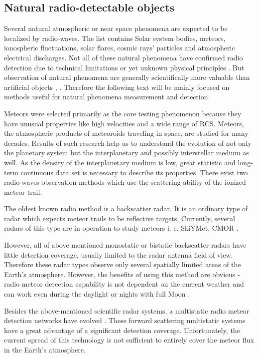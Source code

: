 \documentclass[twoside]{ctuthesis}
\theoremstyle{plain}
\theoremstyle{definition}
\theoremstyle{note}
\begin{document}
\subsection{Natural radio-detectable objects}

Several natural atmospheric or near space phenomena are expected to be localized by radio-waves. The list contains Solar system bodies, meteors, ionospheric fluctuations, solar flares, cosmic rays' particles and atmospheric electrical discharges. Not all of these natural phenomena have confirmed radio detection due to technical limitations or yet unknown physical principles \cite{LOPES}.  But observation of natural phenomena are generally scientifically more valuable than artificial objects \cite{astro_particles}, \cite{LOFAR_showers}. Therefore the following text will be mainly focused on methods useful for natural phenomena measurement and detection. 

Meteors were selected primarily as the core testing phenomenon because they have unusual properties like high velocities and a wide range of RCS. Meteors, the atmospheric products of meteoroids traveling in space, are studied for many decades. Results of such research help us to understand the evolution of not only the planetary system but the interplanetary and possibly interstellar medium \cite{interplanetary_medium} as well. As the density of the interplanetary medium is low, great statistic and long-term continuous data set is necessary to describe its properties. There exist two radio waves observation methods which use the scattering ability of the ionized meteor trail.

The oldest known radio method is a backscatter radar. It is an ordinary type of radar which expects meteor trails to be reflective targets. Currently, several radars of this type are in operation to study meteors i. e.  SkiYMet\cite{skiymet}, CMOR \cite{CMOR_radar}.

However, all of above mentioned monostatic or bistatic backscatter radars have little detection coverage, usually limited to the radar antenna field of view. Therefore these radar types observe only several spatially limited areas of the Earth's atmosphere. However, the benefits of using this method are obvious - radio meteor detection capability is not dependent on the current weather and can work even during the daylight or nights with full Moon \cite{daylight_shover}.

Besides the above-mentioned scientific radar systems, a multistatic radio meteor detection networks have evolved \cite{BRAMS}.
These forward scattering multistatic systems have a great advantage of a significant detection coverage. Unfortunately, the current spread of this technology is not sufficient to entirely cover the meteor flux in the Earth's atmosphere.
\end{document}
